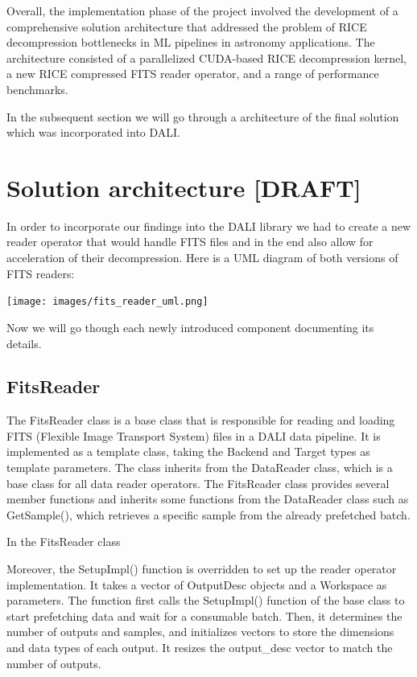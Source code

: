 \documentclass[licencjacka,en]{pracamgr}
\begin{document}
Overall, the implementation phase of the project involved the development of a comprehensive solution architecture that addressed the problem of RICE decompression bottlenecks in ML pipelines in astronomy applications. The architecture consisted of a parallelized CUDA-based RICE decompression kernel, a new RICE compressed FITS reader operator, and a range of performance benchmarks.

In the subsequent section we will go through a architecture of the final solution which was incorporated into DALI.

\section{Solution architecture [DRAFT]}
In order to incorporate our findings into the DALI library we had to create a new reader operator that would handle FITS files and in the end also allow for 
acceleration of their decompression. Here is a UML diagram of both versions of FITS readers: \\

\centerline{\texttt{[image: images/fits\_reader\_uml.png]}}

Now we will go though each newly introduced component documenting its details.
\subsection{FitsReader}
The FitsReader class is a base class that is responsible for reading and loading FITS (Flexible Image Transport System) files in a DALI data pipeline. It is implemented as a template class, taking the Backend and Target types as template parameters. The class inherits from the DataReader class, which is a base class for all data reader operators. The FitsReader class provides several member functions and inherits some functions from the DataReader class such as GetSample(), which retrieves a specific sample from the already prefetched batch.

In the FitsReader class 

Moreover, the SetupImpl() function is overridden to set up the reader operator implementation. It takes a vector of OutputDesc objects and a Workspace as parameters. The function first calls the SetupImpl() function of the base class to start prefetching data and wait for a consumable batch. Then, it determines the number of outputs and samples, and initializes vectors to store the dimensions and data types of each output. It resizes the output\_desc vector to match the number of outputs.
\end{document}
